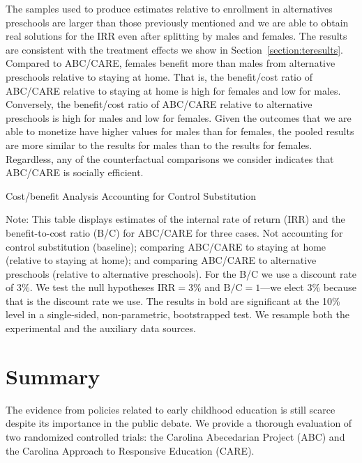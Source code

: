 The samples used to produce estimates relative to enrollment in alternatives preschools are larger than those previously mentioned and we are able to obtain real solutions for the IRR even after splitting by males and females. The results are consistent with the treatment effects we show in Section~\ref{section:teresults}. Compared to ABC/CARE, females benefit more than males from alternative preschools relative to staying at home. That is, the benefit/cost ratio of ABC/CARE relative to staying at home is high for females and low for males. Conversely, the benefit/cost ratio of ABC/CARE relative to alternative preschools is high for males and low for females. Given the outcomes that we are able to monetize have higher values for males than for females, the pooled results are more similar to the results for males than to the results for females. Regardless, any of the counterfactual comparisons we consider indicates that ABC/CARE is socially efficient.

\begin{table}[H]
\begin{threeparttable}
\caption{Cost/benefit Analysis Accounting for Control Substitution}
\label{table:cbacs}
\centering

\begin{tablenotes}
\footnotesize
\item Note: This table displays estimates of the internal rate of return (IRR) and the benefit-to-cost ratio (B/C) for ABC/CARE for three cases. Not accounting for control substitution (baseline); comparing ABC/CARE to staying at home (relative to staying at home); and comparing ABC/CARE to alternative preschools (relative to alternative preschools). For the B/C we use a discount rate of $3\%$. We test the null hypotheses $\text{IRR} = 3\%$ and $\text{B/C} = 1$---we elect $3\%$ because that is the discount rate we use. The results in bold are significant at the 10\% level in a single-sided, non-parametric, bootstrapped test. We resample both the experimental and the auxiliary data sources.
\end{tablenotes}
\end{threeparttable}
\end{table}

\section{Summary} \label{section:conclusion}

The evidence from policies related to early childhood education is still scarce despite its importance in the public debate. We provide a thorough evaluation of two randomized controlled trials: the Carolina Abecedarian Project (ABC) and the Carolina Approach to Responsive Education (CARE).

